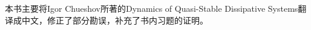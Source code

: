 \begin{pre}
	\thispagestyle{empty}
	本书主要将Igor Chueshov所著的Dynamics of Quasi-Stable Dissipative Systems翻译成中文，修正了部分勘误，补充了书内习题的证明。
\end{pre}